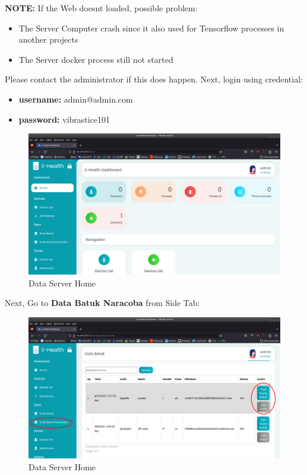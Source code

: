 \documentclass[a4paper,12pt,oneside,pdflatex,italian,final,twocolumn]{article}
\begin{document}
	\textbf{NOTE:} If the Web doesnt loaded, possible problem:

	\begin{itemize}
		\item The Server Computer crash since it also used for Tensorflow processes in another projects

		\item The Server docker process still not started
	\end{itemize}

	Please contact the administrator if this does happen. Next, login using credential:

	\begin{itemize}
		\item \textbf{username:} admin@admin.com
		\item \textbf{password:} vibrastice101
	\end{itemize}

	\newpage
	\centering
	\begin{figure}[!ht]
		\centering
		\includegraphics[width=\textwidth,]{images/web_home.png}
		\caption{Data Server Home}
	\end{figure}
	\raggedright

	Next, Go to \textbf{Data Batuk Naracoba} from Side Tab:

	\centering
	\begin{figure}[!ht]
		\centering
		\includegraphics[width=\textwidth,]{images/web_datanarcob.png}
		\caption{Data Server Home}
	\end{figure}
	\raggedright
\end{document}
